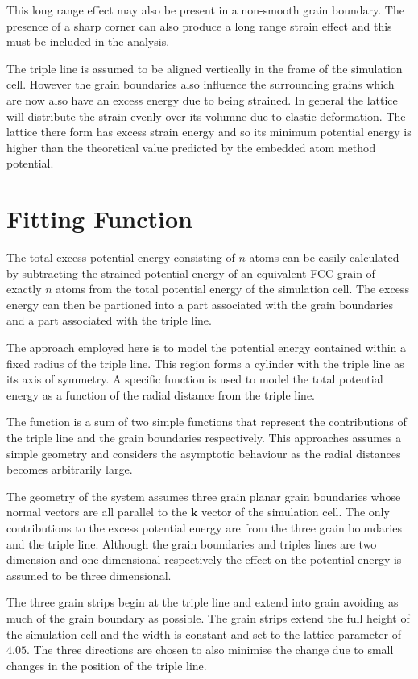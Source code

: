 \documentclass[12pt,a4paper]{book}
\begin{document}
This long range effect may also be present in a non-smooth grain boundary. The presence of a sharp corner can also produce a long range strain effect and this must be included in the analysis.

The triple line is assumed to be aligned vertically in the frame of the simulation cell. However the grain boundaries also influence the surrounding grains which are now also have an excess energy due to being strained. In general the lattice will distribute the strain evenly over its volumne due to elastic deformation. The lattice there form has excess strain energy and so its minimum  potential energy is higher than the theoretical value predicted by the embedded atom method potential.

\section{Fitting Function}

The total excess potential energy consisting of $n$ atoms can be easily calculated by subtracting the strained potential energy of an equivalent FCC grain of exactly $n$ atoms from the total potential energy of the simulation cell. The excess energy can then be partioned into a part associated with the grain boundaries and a part associated with the triple line.

The approach employed here is to model the potential energy contained within a fixed radius of the triple line. This region forms a cylinder with the triple line as its axis of symmetry. A specific function is used to model the total potential energy as a function of the radial distance from the triple line. 

The function is a sum of two simple functions that represent the contributions of the triple line and the grain boundaries respectively. This approaches assumes a simple geometry and considers the asymptotic behaviour as the radial distances becomes arbitrarily large.

The geometry of the system assumes three grain planar grain boundaries whose normal vectors are all parallel to the $\mathbf{k}$ vector of the simulation cell. The only contributions to the excess potential energy are from the three grain boundaries and the triple line. Although the grain boundaries and triples lines are two dimension and one dimensional respectively the effect on the potential energy is assumed to be three dimensional.

The three grain strips begin at the triple line and extend into grain avoiding as much of the grain boundary as possible. The grain strips extend the full height of the simulation cell and the width is constant and set to the lattice parameter of $4.05$. The three directions are chosen to also minimise the change due to small changes in the position of the triple line. 
\end{document}
